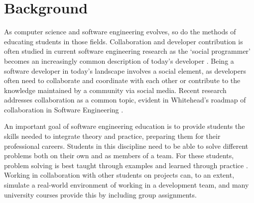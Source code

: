 

\chapter{Background}
As computer science and software engineering evolves, so do the methods of educating students in those fields. Collaboration and developer contribution is often studied in current software engineering research as the `social programmer' becomes an increasingly common description of today’s developer \cite{treude2012programming}. Being a software developer in today’s landscape involves a social element, as developers often need to collaborate and coordinate with each other or contribute to the knowledge maintained by a community via social media. Recent research addresses collaboration as a common topic, evident in Whitehead's roadmap of collaboration in Software Engineering \cite{whitehead2007collaboration}.

An important goal of software engineering education is to provide students the skills needed to integrate theory and practice, preparing them for their professional careers. Students in this discipline need to be able to solve different problems both on their own and as members of a team. For these students, problem solving is best taught through examples and learned through practice \cite{jazayeri2004education}. Working in collaboration with other students on projects can, to an extent, simulate a real-world environment of working in a development team, and many university courses provide this by including group assignments.

